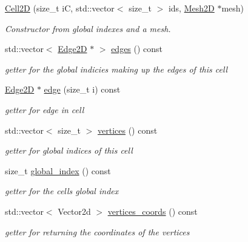 \begin{DoxyCompactItemize}
\item 
\hyperlink{classMeshFramework2D_1_1Cell2D_a2809b2187df931c08882188899a365ae}{Cell2D} (size\+\_\+t iC, std\+::vector$<$ size\+\_\+t $>$ ids, \hyperlink{classMeshFramework2D_1_1Mesh2D}{Mesh2D} $\ast$mesh)
\begin{DoxyCompactList}\small\item\em Constructor from global indexes and a mesh. \end{DoxyCompactList}\item 
std\+::vector$<$ \hyperlink{classMeshFramework2D_1_1Edge2D}{Edge2D} $\ast$ $>$ \hyperlink{classMeshFramework2D_1_1Cell2D_a55049e977f519dc8a161a61726fdac23}{edges} () const
\begin{DoxyCompactList}\small\item\em getter for the global indicies making up the edges of this cell \end{DoxyCompactList}\item 
\hyperlink{classMeshFramework2D_1_1Edge2D}{Edge2D} $\ast$ \hyperlink{classMeshFramework2D_1_1Cell2D_a8bff95ccdb70cd39b8bd3cdbae8b111f}{edge} (size\+\_\+t i) const
\begin{DoxyCompactList}\small\item\em getter for edge in cell \end{DoxyCompactList}\item 
std\+::vector$<$ size\+\_\+t $>$ \hyperlink{classMeshFramework2D_1_1Cell2D_a325799dd2b8542035a9539fc2ec63220}{vertices} () const
\begin{DoxyCompactList}\small\item\em getter for global indices of this cell \end{DoxyCompactList}\item 
size\+\_\+t \hyperlink{classMeshFramework2D_1_1Cell2D_a153ec3d2c9b22dbfd0cf68419647a387}{global\+\_\+index} () const
\begin{DoxyCompactList}\small\item\em getter for the cells global index \end{DoxyCompactList}\item 
std\+::vector$<$ Vector2d $>$ \hyperlink{classMeshFramework2D_1_1Cell2D_a3a7aff59de8ef842d92e17b29de65be4}{vertices\+\_\+coords} () const
\begin{DoxyCompactList}\small\item\em getter for returning the coordinates of the vertices \end{DoxyCompactList}\item 

\end{DoxyCompactItemize}
